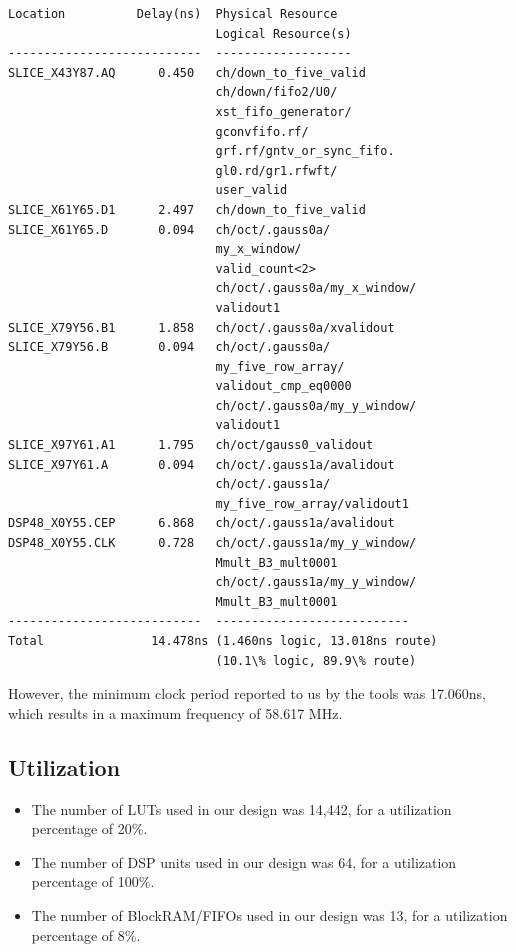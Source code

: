 \noindent \begin{lstlisting}
Location          Delay(ns)  Physical Resource
                             Logical Resource(s)
---------------------------  -------------------
SLICE_X43Y87.AQ      0.450   ch/down_to_five_valid
                             ch/down/fifo2/U0/
                             xst_fifo_generator/
                             gconvfifo.rf/
                             grf.rf/gntv_or_sync_fifo.
                             gl0.rd/gr1.rfwft/
                             user_valid
SLICE_X61Y65.D1      2.497   ch/down_to_five_valid
SLICE_X61Y65.D       0.094   ch/oct/.gauss0a/
                             my_x_window/
                             valid_count<2>
                             ch/oct/.gauss0a/my_x_window/
                             validout1
SLICE_X79Y56.B1      1.858   ch/oct/.gauss0a/xvalidout
SLICE_X79Y56.B       0.094   ch/oct/.gauss0a/
                             my_five_row_array/
                             validout_cmp_eq0000
                             ch/oct/.gauss0a/my_y_window/
                             validout1
SLICE_X97Y61.A1      1.795   ch/oct/gauss0_validout
SLICE_X97Y61.A       0.094   ch/oct/.gauss1a/avalidout
                             ch/oct/.gauss1a/
                             my_five_row_array/validout1
DSP48_X0Y55.CEP      6.868   ch/oct/.gauss1a/avalidout
DSP48_X0Y55.CLK      0.728   ch/oct/.gauss1a/my_y_window/
                             Mmult_B3_mult0001
                             ch/oct/.gauss1a/my_y_window/
                             Mmult_B3_mult0001
---------------------------  ---------------------------
Total               14.478ns (1.460ns logic, 13.018ns route)
                             (10.1\% logic, 89.9\% route)
\end{lstlisting}

However, the minimum clock period reported to us by the tools was 17.060ns, 
which results in a maximum frequency of 58.617 MHz.

\subsection{Utilization}

\begin{itemize}
\item The number of LUTs used in our design was 14,442, for a utilization percentage of 20\%.
\item The number of DSP units used in our design was 64, for a utilization percentage of 100\%.
\item The number of BlockRAM/FIFOs used in our design was 13, for a utilization percentage of 8\%.
\end{itemize}

